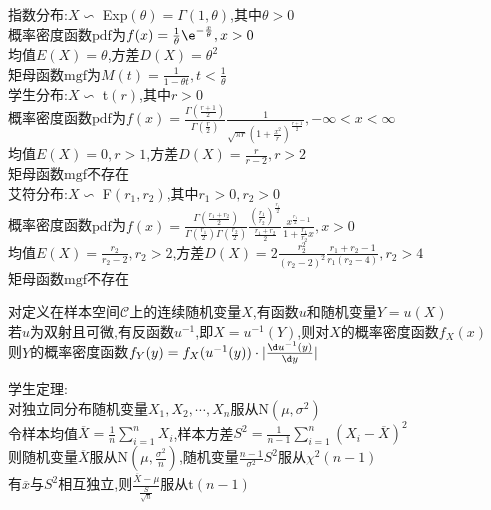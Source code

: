 指数分布:$X\backsim$ Exp$(\theta)=\Gamma(1,\theta)$,其中$\theta>0$\\
概率密度函数$\mathrm{pdf}$为$f(x)=\frac{1}{\theta}\e^{-\frac{x}{\theta}},x>0$\\
均值$E(X)=\theta$,方差$D(X)=\theta^2$\\
矩母函数$\mathrm{mgf}$为$M(t)=\frac{1}{1-\theta t},t<\frac{1}{\theta}$\\

学生分布:$X\backsim$ t$(r)$,其中$r>0$\\
概率密度函数$\mathrm{pdf}$为$f(x)=\frac{\Gamma(\frac{r+1}{2})}{\Gamma(\frac{r}{2})}\frac{1}{\sqrt{\pi r}(1+\frac{x^2}{r})^{\frac{r+1}{2}}},-\infty<x<\infty$\\
均值$E(X)=0,r>1$,方差$D(X)=\frac{r}{r-2},r>2$\\
矩母函数$\mathrm{mgf}$不存在\\

艾符分布:$X\backsim$ F$(r_1,r_2)$,其中$r_1>0,r_2>0$\\
概率密度函数$\mathrm{pdf}$为$f(x)=\frac{\Gamma(\frac{r_1+r_2}{2})}{\Gamma(\frac{r_1}{2})\Gamma(\frac{r_2}{2})}\frac{(\frac{r_1}{r_2})^{\frac{r_1}{2}}}{\frac{r_1+r_2}{2}}\frac{x^{\frac{r_1}{2}-1}}{1+\frac{r_1}{r_2}x},x>0$\\
均值$E(X)=\frac{r_2}{r_2-2},r_2>2$,方差$D(X)=2\frac{r_2^2}{(r_2-2)^2}\frac{r_1+r_2-1}{r_1(r_2-4)},r_2>4$\\
矩母函数$\mathrm{mgf}$不存在\\

\begin{dingli}
对定义在样本空间$\mathcal{C}$上的连续随机变量$X$,有函数$u$和随机变量$Y=u(X)$\\
若$u$为双射且可微,有反函数$u^{-1}$,即$X=u^{-1}(Y)$,则对$X$的概率密度函数$f_X(x)$\\
则$Y$的概率密度函数$f_Y(y)=f_X(u^{-1}(y))\cdot |\frac{\d u^{-1}(y)}{\d y}|$
\end{dingli}

\begin{dingli}
学生定理:\\
对独立同分布随机变量$X_1,X_2,\cdots,X_n$服从N$(\mu,\sigma^2)$\\
令样本均值$\overline{X}=\frac{1}{n}\sum\limits_{i=1}^{n}X_i$,样本方差$S^2=\frac{1}{n-1}\sum\limits_{i=1}^{n}(X_i-\overline{X})^2$\\
则随机变量$\overline{X}$服从N$(\mu,\frac{\sigma^2}{n})$,随机变量$\frac{n-1}{\sigma^2}S^2$服从$\chi^2(n-1)$\\
有$\overline{x}$与$S^2$相互独立,则$\frac{\overline{X}-\mu}{\frac{S}{\sqrt{n}}}$服从t$(n-1)$
\end{dingli}

